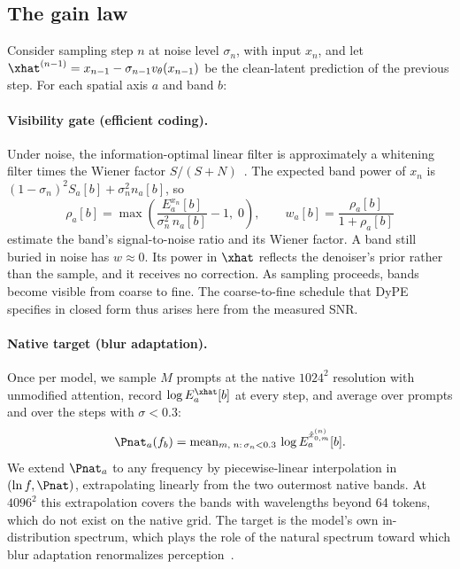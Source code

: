 \subsection{The gain law}
\label{sec:gainlaw}
Consider sampling step $n$ at noise level $\sigma_n$, with input $x_n$, and let $\xhat^{(n-1)}=x_{n-1}-\sigma_{n-1}v_\theta(x_{n-1})$ be the clean-latent prediction of the previous step. For each spatial axis $a$ and band $b$:

\paragraph{Visibility gate (efficient coding).}
Under noise, the information-optimal linear filter is approximately a whitening filter times the Wiener factor $S/(S+N)$~\citep{atick1990towards,atick1992retina,vanhateren1992theory}. The expected band power of $x_n$ is $(1-\sigma_n)^2S_a[b]+\sigma_n^2n_a[b]$, so
\begin{equation}
\rho_a[b] = \max\!\left(\frac{E_a^{x_n}[b]}{\sigma_n^2\, n_a[b]} - 1,\; 0\right),\qquad
w_a[b] = \frac{\rho_a[b]}{1+\rho_a[b]}
\label{eq:gate}
\end{equation}
estimate the band's signal-to-noise ratio and its Wiener factor. A band still buried in noise has $w\approx0$. Its power in $\xhat$ reflects the denoiser's prior rather than the sample, and it receives no correction. As sampling proceeds, bands become visible from coarse to fine. The coarse-to-fine schedule that DyPE specifies in closed form thus arises here from the measured SNR.

\paragraph{Native target (blur adaptation).}
Once per model, we sample $M$ prompts at the native $1024^2$ resolution with unmodified attention, record $\log E_a^{\xhat}[b]$ at every step, and average over prompts and over the steps with $\sigma<0.3$:
\begin{equation}
\Pnat_a(f_b) = \operatorname{mean}_{m,\;n:\,\sigma_n<0.3}\, \log E_a^{\hat x_{0,m}^{(n)}}[b] .
\label{eq:native}
\end{equation}
We extend $\Pnat_a$ to any frequency by piecewise-linear interpolation in $(\ln f,\Pnat)$, extrapolating linearly from the two outermost native bands. At $4096^2$ this extrapolation covers the bands with wavelengths beyond 64 tokens, which do not exist on the native grid. The target is the model's own in-distribution spectrum, which plays the role of the natural spectrum toward which blur adaptation renormalizes perception~\citep{webster2002neural}.

